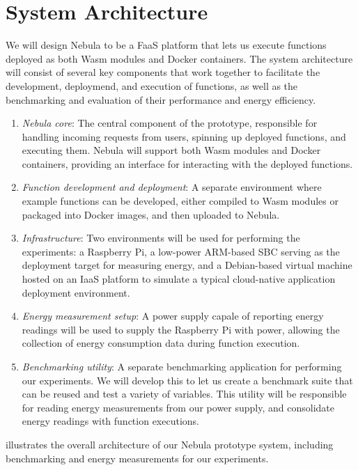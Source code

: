 \documentclass[
  table]{report}
\begin{document}
\newpage

\section{System Architecture}

We will design Nebula to be a \ac{FaaS} platform that lets us execute
functions deployed as both \ac{Wasm} modules and Docker containers. The
system architecture will consist of several key components that work
together to facilitate the development, deploymend, and execution of
functions, as well as the benchmarking and evaluation of their
performance and energy efficiency.

\begin{enumerate}
\def\labelenumi{\arabic{enumi}.}
\item
  \emph{Nebula core}: The central component of the prototype,
  responsible for handling incoming requests from users, spinning up
  deployed functions, and executing them. Nebula will support both
  \ac{Wasm} modules and Docker containers, providing an interface for
  interacting with the deployed functions.
\item
  \emph{Function development and deployment}: A separate environment
  where example functions can be developed, either compiled to \ac{Wasm}
  modules or packaged into Docker images, and then uploaded to Nebula.
\item
  \emph{Infrastructure}: Two environments will be used for performing
  the experiments: a Raspberry Pi, a low-power ARM-based \ac{SBC}
  serving as the deployment target for measuring energy, and a
  Debian-based virtual machine hosted on an \ac{IaaS} platform to
  simulate a typical cloud-native application deployment environment.
\item
  \emph{Energy measurement setup}: A power supply capale of reporting
  energy readings will be used to supply the Raspberry Pi with power,
  allowing the collection of energy consumption data during function
  execution.
\item
  \emph{Benchmarking utility}: A separate benchmarking application for
  performing our experiments. We will develop this to let us create a
  benchmark suite that can be reused and test a variety of variables.
  This utility will be responsible for reading energy measurements from
  our power supply, and consolidate energy readings with function
  executions.
\end{enumerate}

 illustrates the overall architecture of our
Nebula prototype system, including benchmarking and energy measurements
for our experiments.
\end{document}
